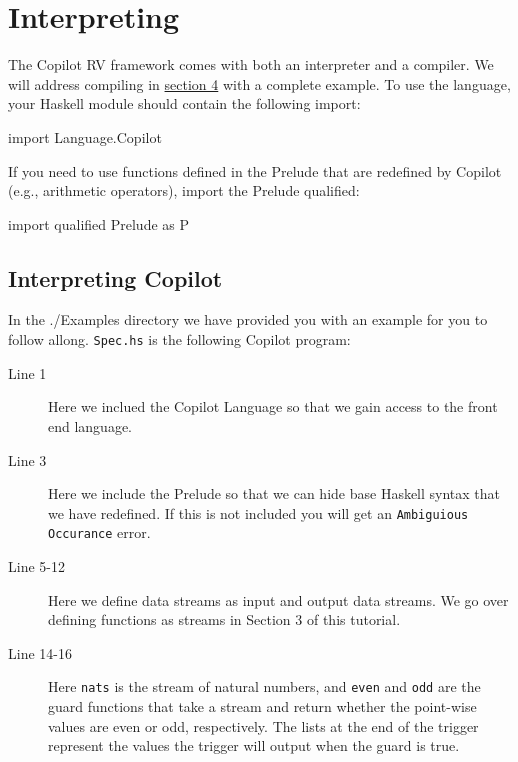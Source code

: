 \newpage 
\section{Interpreting}
\label{interpcompile}
The Copilot RV framework comes with both an interpreter and a
compiler. We will address compiling in \hyperref[sec:complete_example]{section 4} with a complete example. 
\noindent To use the language, your Haskell module should contain the following import:
%
\begin{code}
import Language.Copilot
\end{code}
%
If you need to use functions defined in the Prelude that are redefined by
Copilot (e.g., arithmetic operators), import the Prelude qualified:
%
\begin{code}
import qualified Prelude as P
\end{code}

\subsection{Interpreting Copilot}
In the ./Examples directory we have provided you with an example
for you to follow allong. \texttt{Spec.hs} is the following Copilot program:
%

%
%
%
%
%
\begin{description}
  \item[Line 1] Here we inclued the Copilot Language so that we gain access to the
  front end language.
  \item[Line 3] Here we include the Prelude so that we can hide base Haskell syntax
  that we have redefined. If this is not included you will get an \texttt{Ambiguious
  Occurance} error. 
  \item[Line 5-12] Here we define data streams as input and output data streams. We
  go over defining functions as streams in Section 3 of this tutorial. 
  \item[Line 14-16] Here {\tt nats} is the stream of natural numbers, and {\tt even} and {\tt odd}
  are the guard functions that take a stream and return whether the point-wise
  values are even or odd, respectively. The lists at the end of the trigger
  represent the values the trigger will output when the guard is true.

\end{description}

